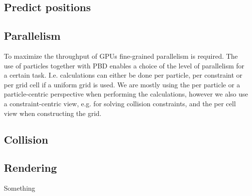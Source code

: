 

\subsection{Predict positions}


\subsection{Parallelism} To maximize the throughput of GPUs fine-grained
parallelism is required. The use of particles together with PBD enables a
choice of the level of parallelism for a certain task. I.e. calculations can
either be done per particle, per constraint or per grid cell if a uniform grid
is used. We are mostly using the per particle or a particle-centric perspective
when performing the calculations, however we also use a constraint-centric
view, e.g. for solving collision constraints, and the per cell view when
constructing the grid.


\subsection{Collision}



\subsection{Rendering}

Something \cite{van2009screen}
